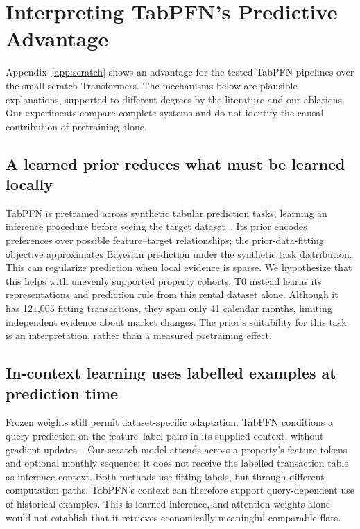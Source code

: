 \documentclass[conference]{IEEEtran}
\begin{document}
\clearpage
\section{Interpreting TabPFN's Predictive Advantage}\label{app:tabpfninterpretation}
\begingroup\small
Appendix~\ref{app:scratch} shows an advantage for the tested TabPFN pipelines over the small scratch Transformers. The mechanisms below are plausible explanations, supported to different degrees by the literature and our ablations. Our experiments compare complete systems and do not identify the causal contribution of pretraining alone.

\subsection{A learned prior reduces what must be learned locally}
TabPFN is pretrained across synthetic tabular prediction tasks, learning an inference procedure before seeing the target dataset~\cite{tabpfnprior}. Its prior encodes preferences over possible feature--target relationships; the prior-data-fitting objective approximates Bayesian prediction under the synthetic task distribution. This can regularize prediction when local evidence is sparse. We hypothesize that this helps with unevenly supported property cohorts. T0 instead learns its representations and prediction rule from this rental dataset alone. Although it has 121,005 fitting transactions, they span only 41 calendar months, limiting independent evidence about market changes. The prior's suitability for this task is an interpretation, rather than a measured pretraining effect.

\subsection{In-context learning uses labelled examples at prediction time}
Frozen weights still permit dataset-specific adaptation: TabPFN conditions a query prediction on the feature--label pairs in its supplied context, without gradient updates~\cite{tabpfnprior}. Our scratch model attends across a property's feature tokens and optional monthly sequence; it does not receive the labelled transaction table as inference context. Both methods use fitting labels, but through different computation paths. TabPFN's context can therefore support query-dependent use of historical examples. This is learned inference, and attention weights alone would not establish that it retrieves economically meaningful comparable flats.
\end{document}
